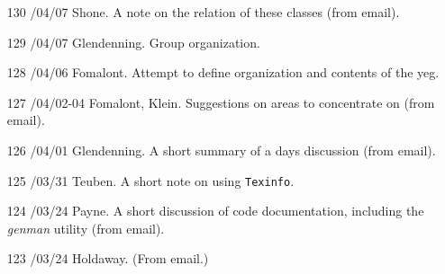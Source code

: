 \begin{enumerate}
\item[130]
/04/07 Shone.
\linebreak  A note on the relation of these classes (from email).

\item[129]
/04/07 Glendenning.
\linebreak  Group organization.

\item[128]
/04/06 Fomalont.
\linebreak  Attempt to define organization and contents of the yeg.

\item[127]
/04/02-04 Fomalont, Klein.
\linebreak  Suggestions on areas to concentrate on (from email).

\item[126]
/04/01 Glendenning.
\linebreak  A short summary of a days discussion (from email).

\item[125]
/03/31 Teuben.
\linebreak  A short note on using \texttt{Texinfo}.

\item[124]
/03/24 Payne.
\linebreak  A short discussion of code documentation, including the \textit{genman}
   utility (from email).

\item[123]
/03/24 Holdaway.
\linebreak  (From email.)


\end{enumerate}
